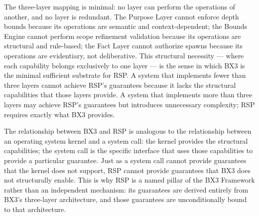The three-layer mapping is minimal: no layer can perform the operations of another, and no layer is redundant. The Purpose Layer cannot enforce depth bounds because its operations are semantic and context-dependent; the Bounds Engine cannot perform scope refinement validation because its operations are structural and rule-based; the Fact Layer cannot authorize spawns because its operations are evidentiary, not deliberative. This structural necessity — where each capability belongs exclusively to one layer — is the sense in which BX3 is the minimal sufficient substrate for RSP. A system that implements fewer than three layers cannot achieve RSP's guarantees because it lacks the structural capabilities that those layers provide. A system that implements more than three layers may achieve RSP's guarantees but introduces unnecessary complexity; RSP requires exactly what BX3 provides.

The relationship between BX3 and RSP is analogous to the relationship between an operating system kernel and a system call: the kernel provides the structural capabilities; the system call is the specific interface that uses those capabilities to provide a particular guarantee. Just as a system call cannot provide guarantees that the kernel does not support, RSP cannot provide guarantees that BX3 does not structurally enable. This is why RSP is a named pillar of the BX3 Framework rather than an independent mechanism: its guarantees are derived entirely from BX3's three-layer architecture, and those guarantees are unconditionally bound to that architecture.